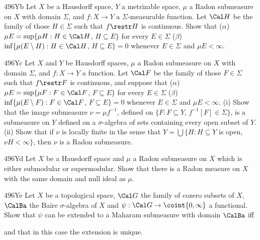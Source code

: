 {\spheader 496Yb
Let $X$ be a Hausdorff space, $Y$ a metrizable space,
$\mu$ a Radon submeasure on $X$ with domain $\Sigma$, and $f:X\to Y$ a
$\Sigma$-measurable
function.   Let $\Cal H$ be the family of those $H\in\Sigma$ such that
$f\restr H$ is continuous.   Show that ($\alpha$)
$\mu E=\sup\{\mu H:H\in\Cal H$, $H\subseteq E\}$ for every $E\in\Sigma$
($\beta$) $\inf\{\mu(E\setminus H):H\in\Cal H$, $H\subseteq E\}=0$ whenever
$E\in\Sigma$ and $\mu E<\infty$.

\spheader 496Yc
Let $X$ and $Y$ be Hausdorff spaces, $\mu$ a Radon
submeasure on $X$ with domain $\Sigma$, and $f:X\to Y$ a function.
Let $\Cal F$ be the family of those $F\in\Sigma$ such that
$f\restr F$ is continuous, and suppose that ($\alpha$)
$\mu E=\sup\{\mu F:F\in\Cal F$, $F\subseteq E\}$ for every $E\in\Sigma$
($\beta$) $\inf\{\mu(E\setminus F):F\in\Cal F$, $F\subseteq E\}=0$ whenever
$E\in\Sigma$ and $\mu E<\infty$.
(i) Show that the image submeasure
$\nu=\mu f^{-1}$, defined on $\{F:F\subseteq Y$, $f^{-1}[F]\in\Sigma\}$,
is a submeasure on $Y$ defined on a $\sigma$-algebra of sets
containing every open subset of $Y$.
(ii) Show that if $\nu$ is locally finite in the sense that
$Y=\bigcup\{H:H\subseteq Y$ is open, $\nu H<\infty\}$, then $\nu$ is a
Radon submeasure.

\spheader 496Yd Let $X$ be a Hausdorff space and $\mu$ a Radon submeasure
on $X$ which is either submodular or supermodular.   Show that there is a
Radon measure on $X$ with the same domain and null ideal as $\mu$.

\spheader 496Ye Let $X$ be a topological space, $\Cal G$ the family of
cozero subsets of $X$, $\CalBa$ the Baire $\sigma$-algebra of $X$ and
$\psi:\Cal G\to\coint{0,\infty}$ a functional.   Show that $\psi$ can be
extended to a Maharam submeasure with domain $\CalBa$ iff


\noindent and that in this case the extension is unique.   

}
